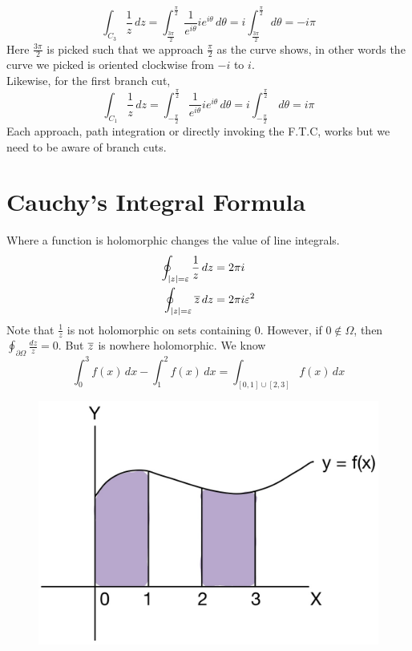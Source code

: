\documentclass[11pt]{article}
\begin{document}
$$\int_{C_3}\frac{1}{z} \, dz = \int_{\frac{3\pi}{2}}^{\frac{\pi}{2}} \frac{1}{e^{i\theta}}ie^{i\theta}\, d\theta = i \int_{\frac{3\pi}{2}}^{\frac{\pi}{2}} \,d\theta = -i\pi$$
Here $\frac{3\pi}{2}$ is picked such that we approach $\frac{\pi}{2}$ as the curve shows, in other words the curve we picked is oriented clockwise from $-i$ to $i$. \\
Likewise, for the first branch cut, 
$$\int_{C_1}\frac{1}{z} \, dz = \int_{-\frac{\pi}{2}}^{\frac{\pi}{2}}\frac{1}{e^{i\theta}}ie^{i\theta}\,d\theta = i\int_{-\frac{\pi}{2}}^{\frac{\pi}{2}}\,d\theta = i\pi$$
Each approach, path integration or directly invoking the F.T.C, works but we need to be aware of branch cuts. 

\newpage
\section{Cauchy's Integral Formula}
Where a function is holomorphic changes the value of line integrals. 
\begin{align*}
\oint_{|z| = \varepsilon} \frac{1}{z} \, dz &= 2\pi i \\
\oint_{|z| = \varepsilon} \overline{z} \, dz &= 2\pi i \varepsilon^2
\end{align*}
Note that $\frac{1}{z}$ is not holomorphic on sets containing 0. However, if $0 \notin \Omega$, then $\oint_{\partial \Omega}\frac{dz}{z} = 0$. But $\overline{z}$ is nowhere holomorphic. We know 
$$ \int_0^3 f(x) \, dx - \int_1^2f(x) \, dx = \int_{[0, 1]\cup[2, 3]}f(x) \, dx$$
\vspace{-5mm}
\begin{figure}[H]
\includegraphics[scale = 0.2]{13_1}
\centering
\end{figure}
\end{document}
